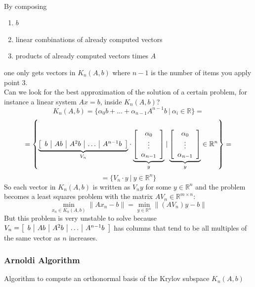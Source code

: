 \documentclass[10pt]{report}
\begin{document}
\paragraph{}
By composing \begin{enumerate}
	\item $b$
	\item linear combinations of already computed vectors
	\item products of already computed vectors times $A$
\end{enumerate}
one only gets vectors in $K_n(A,b)$ where $n-1$ is the number of items you apply point 3.\\
Can we look for the best approximation of the solution of a certain problem, for instance a linear system $Ax=b$, inside $K_n(A,b)$?
$$K_n(A,b) = \{\alpha_0b+\ldots + \alpha_{n-1}A^{n-1}b\:|\:\alpha_i\in \mathbb{R}\} =$$ $$= \left\{\underset{V_n}{\underbrace{\left[\begin{array}{c | c | c | c | c}
b & Ab &A^2b & \ldots & A^{n-1}b
\end{array}\right]}}\cdot\underset{y}{\underbrace{\left[\begin{array}{c}
\alpha_0\\\vdots\\\alpha_{n-1}
\end{array}\right]}}\:|\:\underset{y}{\underbrace{\left[\begin{array}{c}
\alpha_0\\\vdots\\\alpha_{n-1}
\end{array}\right]}}\in \mathbb{R}^n \right\}=$$ $$= \{V_n\cdot y\:|\:y \in \mathbb{R}^n\}$$
So each vector in $K_n(A,b)$ is written as $V_ny$ for some $y\in \mathbb{R}^n$ and the problem becomes a least squares problem with the matrix $AV_n\in \mathbb{R}^{m\times n}$:
$$\min_{x_n\in K_n(A,b)} \|Ax_n - b\| = \min_{y\in \mathbb{R}^n} \|(AV_n)y-b\|$$
But this problem is very unstable to solve because $V_n = \left[\begin{array}{c | c | c | c | c}
b & Ab &A^2b & \ldots & A^{n-1}b
\end{array}\right]$ has columns that tend to be all multiples of the same vector as $n$ increases.
\subsubsection{Arnoldi Algorithm} Algorithm to compute an orthonormal basis of the Krylov subspace $K_n(A,b)$
\end{document}
